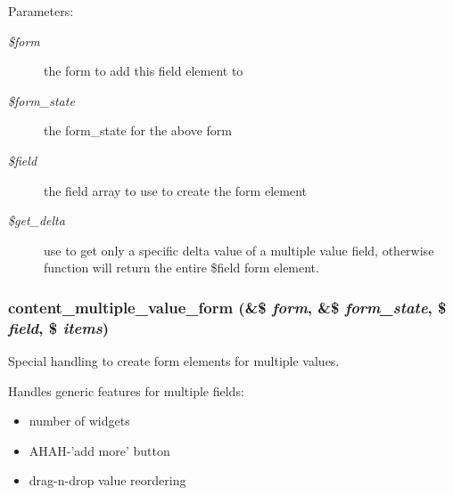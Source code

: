 \begin{Desc}
\item[Parameters:]
\begin{description}
\item[{\em \$form}]the form to add this field element to \item[{\em \$form\_\-state}]the form\_\-state for the above form \item[{\em \$field}]the field array to use to create the form element \item[{\em \$get\_\-delta}]use to get only a specific delta value of a multiple value field, otherwise function will return the entire \$field form element. \end{description}
\end{Desc}
\hypertarget{content_8node__form_8inc_2b35316dcffea9939af18ab1a24b5ab8}{
\subsubsection[{content\_\-multiple\_\-value\_\-form}]{\setlength{\rightskip}{0pt plus 5cm}content\_\-multiple\_\-value\_\-form (\&\$ {\em form}, \/  \&\$ {\em form\_\-state}, \/  \$ {\em field}, \/  \$ {\em items})}}
\label{content_8node__form_8inc_2b35316dcffea9939af18ab1a24b5ab8}


Special handling to create form elements for multiple values.

Handles generic features for multiple fields:\begin{itemize}
\item number of widgets\item AHAH-'add more' button\item drag-n-drop value reordering \end{itemize}
